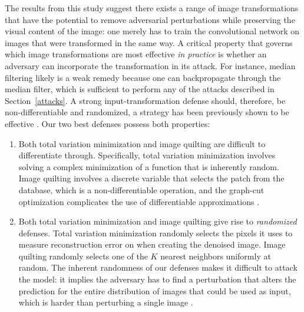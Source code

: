 The results from this study suggest there exists a range of image transformations that have the potential to remove adversarial perturbations while preserving the visual content of the image: one merely has to train the convolutional network on images that were transformed in the same way. A critical property that governs which image transformations are most effective \emph{in practice} is whether an adversary can incorporate the transformation in its attack. For instance, median filtering likely is a weak remedy because one can backpropagate through the median filter, which is sufficient to perform any of the attacks described in Section~\ref{attacks}. A strong input-transformation defense should, therefore, be non-differentiable and randomized, a strategy has been previously shown to be effective \citep{wang2016adversary, wang2016learning}. %
Our two best defenses possess both properties:
\begin{enumerate}
\item Both total variation minimization and image quilting are difficult to differentiate through. Specifically, total variation minimization involves solving a complex minimization of a function that is inherently random. Image quilting involves a discrete variable that selects the patch from the database, which is a non-differentiable operation, and the graph-cut optimization complicates the use of differentiable approximations \citep{maddison16concrete}.
\item Both total variation minimization and image quilting give rise to \emph{randomized} defenses. Total variation minimization randomly selects the pixels it uses to measure reconstruction error on when creating the denoised image. Image quilting randomly selects one of the $K$ nearest neighbors uniformly at random. The inherent randomness of our defenses makes it difficult to attack the model: it implies the adversary has to find a perturbation that alters the prediction for the entire distribution of images that could be used as input, which is harder than perturbing a single image \citep{moosavi2017universal}.
\end{enumerate}

